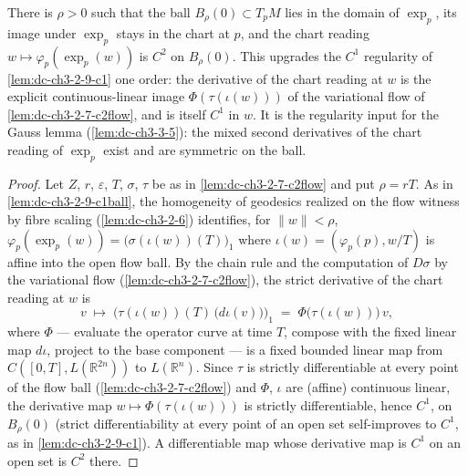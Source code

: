 \begin{lemma}
  \label{lem:dc-ch3-2-9-c2ball}
  \leanok
  There is $\rho > 0$ such that the ball $B_\rho(0) \subset T_pM$ lies in the
  domain of $\exp_p$, its image under $\exp_p$ stays in the chart at $p$, and
  the chart reading $w \mapsto \varphi_p(\exp_p(w))$ is $C^2$ on $B_\rho(0)$.
  This upgrades the $C^1$ regularity of \cref{lem:dc-ch3-2-9-c1} one order:
  the derivative of the chart reading at $w$ is the explicit
  continuous-linear image $\Phi(\tau(\iota(w)))$ of the variational flow of
  \cref{lem:dc-ch3-2-7-c2flow}, and is itself $C^1$ in $w$. It is the
  regularity input for the Gauss lemma (\cref{lem:dc-ch3-3-5}): the mixed
  second derivatives of the chart reading of $\exp_p$ exist and are symmetric
  on the ball.
\end{lemma}
\begin{proof}
  \sketch
  \leanok
  Let $Z$, $r$, $\varepsilon$, $T$, $\sigma$, $\tau$ be as in
  \cref{lem:dc-ch3-2-7-c2flow} and put $\rho = rT$. As in
  \cref{lem:dc-ch3-2-9-c1ball}, the homogeneity of geodesics realized on the
  flow witness by fibre scaling (\cref{lem:dc-ch3-2-6}) identifies, for
  $\|w\| < \rho$,
  $\varphi_p(\exp_p(w)) = \big(\sigma(\iota(w))(T)\big)_1$ where
  $\iota(w) = (\varphi_p(p), w/T)$ is affine into the open flow ball. By the
  chain rule and the computation of $D\sigma$ by the variational flow
  (\cref{lem:dc-ch3-2-7-c2flow}), the strict derivative of the chart reading
  at $w$ is
  $$
  v \;\longmapsto\; \Big(\tau(\iota(w))(T)\,\big(d\iota(v)\big)\Big)_1
  \;=\; \Phi\big(\tau(\iota(w))\big)\,v,
  $$
  where $\Phi$ — evaluate the operator curve at time $T$, compose with the
  fixed linear map $d\iota$, project to the base component — is a fixed
  bounded linear map from $C([0,T], L(\mathbb{R}^{2n}))$ to
  $L(\mathbb{R}^n)$. Since $\tau$ is strictly differentiable at every point
  of the flow ball (\cref{lem:dc-ch3-2-7-c2flow}) and $\Phi$, $\iota$ are
  (affine) continuous linear, the derivative map
  $w \mapsto \Phi(\tau(\iota(w)))$ is strictly differentiable, hence $C^1$,
  on $B_\rho(0)$ (strict differentiability at every point of an open set
  self-improves to $C^1$, as in \cref{lem:dc-ch3-2-9-c1}). A differentiable
  map whose derivative map is $C^1$ on an open set is $C^2$ there.
\end{proof}

